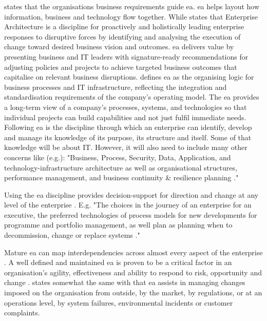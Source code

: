 \textcite{White2018} states that the organisations business requirements guide \acrshort{ea}. \acrshort{ea} helps layout how information, business and technology flow together. While \textcite{Gartner} states that Enterprise Architecture is a discipline for proactively and holistically leading enterprise responses to disruptive forces by identifying and analysing the execution of change toward desired business vision and outcomes. \acrshort{ea} delivers value by presenting business and IT leaders with signature-ready recommendations for adjusting policies and projects to achieve targeted business outcomes that capitalise on relevant business disruptions. \textcite[p.~9]{Ross2014} defines \acrshort{ea} as the organising logic for business processes and IT infrastructure, reflecting the integration and standardisation requirements of the company's operating model. The \acrshort{ea} provides a long-term view of a company's processes, systems, and technologies so that individual projects can build capabilities and not just fulfil immediate needs. Following \textcite[p.~4]{Graves2009} \acrshort{ea} is the discipline through which an enterprise can identify, develop and manage its knowledge of its purpose, its structure and itself. Some of that knowledge will be about IT. However, it will also need to include many other concerns like (e.g.): "Business, Process, Security, Data, Application, and technology-infrastructure architecture as well as organisational structures, performance management, and  business continuity \& resilience planning \parencite[p.~4]{Graves2009}."

Using the \acrshort{ea} discipline provides decision-support for direction and change at any level of the enterprise \parencite[p.~4]{Graves2009}. E.g. "The choices in the journey of an enterprise for an executive, the preferred technologies of process models for new developments for programme and portfolio management, as well plan as planning when to decommission, change or replace systems \parencite[p.~4]{Graves2009}."

Mature \acrshort{ea} can map interdependencies across almost every aspect of the enterprise \parencite[p.~5]{Graves2009}. A well defined and maintained \acrshort{ea} is proven to be a critical factor in an organisation's agility, effectiveness and ability to respond to risk, opportunity and change \parencite{Ross2014}. \textcite[p.~5]{Graves2009} states somewhat the same with that \acrshort{ea} assists in managing changes imposed on the organisation from outside, by the market, by regulations, or at an operations level, by system failures, environmental incidents or customer complaints.

